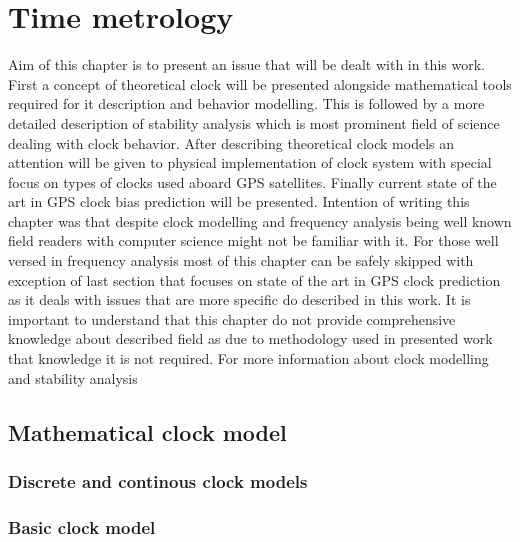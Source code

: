 \chapter{Time metrology}
Aim of this chapter is to present an issue that will be dealt with in this work.
First a concept of theoretical clock will be presented alongside mathematical tools required
for it description and behavior modelling.
This is followed by a more detailed description of stability analysis which is most prominent
field of science dealing with clock behavior.
After describing theoretical clock models an attention will be given to physical implementation
of clock system with special focus on types of clocks used aboard GPS satellites.
Finally current state of the art in GPS clock bias prediction will be presented.
Intention of writing this chapter was that despite clock modelling and frequency analysis being
well known field readers with computer science might not be familiar with it.
For those well versed in frequency analysis most of this chapter can be safely skipped with 
exception of last section that focuses on state of the art in GPS clock prediction as it 
deals with issues that are more specific do described in this work.
It is important to understand that this chapter do not provide comprehensive knowledge about
described field as due to methodology used in presented work that knowledge it is not required.
For more information about clock modelling and stability analysis 



\section{Mathematical clock model}

\subsection{Discrete and continous clock models}

\subsection{Basic clock model}

